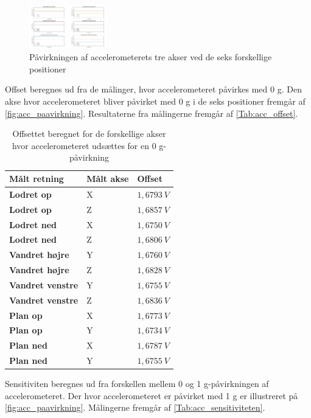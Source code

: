 \begin{figure}[H]
\centering
\includegraphics[width=0.3\textwidth]{figures/paavirkning}
\caption{Påvirkningen af accelerometerets tre akser ved de seks forskellige positioner}
\label{fig:paavirkning}
\end{figure}

Offset beregnes ud fra de målinger, hvor accelerometeret påvirkes med 0 g. Den akse hvor accelerometeret bliver påvirket med 0 g i de seks positioner fremgår af \autoref{fig:acc_paavirkning}. Resultaterne fra målingerne fremgår af \autoref{Tab:acc_offset}. 

\begin{table}[H]
	\centering
	\begin{tabular}{|l|l|l|}
	\textbf{Målt retning} & \textbf{Målt akse} & \textbf{Offset} \\ \hline
    \textbf{Lodret op} 		& X 		& $1,6793~V$ 	\\ \hline
    \textbf{Lodret op} 		& Z 		& $1,6857~V$ 	 \\ \hline
    \textbf{Lodret ned}		& X 		& $1,6750~V$ 	\\ \hline
    \textbf{Lodret ned}		& Z 		& $1,6806~V$  	\\ \hline
    \textbf{Vandret højre} 	& Y 		& $1,6760~V$    \\ \hline     
    \textbf{Vandret højre} 	& Z 		& $1,6828~V$ 	\\ \hline
    \textbf{Vandret venstre}	& Y 		& $1,6755~V$ 	\\ \hline
    \textbf{Vandret venstre}	& Z 		& $1,6836~V$		\\ \hline
    \textbf{Plan op} 		& X 		& $1,6773~V$		\\ \hline		
    \textbf{Plan op} 		& Y 		& $1,6734~V$    \\ \hline
    \textbf{Plan ned} 		& X 		& $1,6787~V$		\\ \hline
    \textbf{Plan ned} 		& Y 		& $1,6755~V$		\\ \hline
	\end{tabular}
	\caption{Offsettet beregnet for de forskellige akser hvor accelerometeret udsættes for en 0 g-påvirkning}
	\label{Tab:acc_offset}
\end{table}

Sensitiviten beregnes ud fra forskellen mellem 0 og 1 g-påvirkningen af accelerometeret. Der hvor accelerometeret er påvirket med 1 g er illustreret på \autoref{fig:acc_paavirkning}. Målingerne fremgår af \autoref{Tab:acc_sensitiviteten}. 

